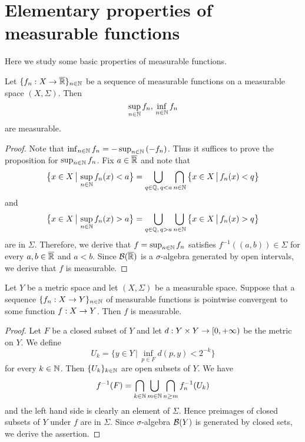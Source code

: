 \section{Elementary properties of measurable functions}
\noindent
Here we study some basic properties of measurable functions.

\begin{proposition}\label{proposition:measurable_functions_closed_under_supremum}
Let $\{f_n:X\rightarrow \overline{{\mathbb R}}\}_{n\in {\mathbb N}}$ be a sequence of measurable functions on a measurable space $(X,\Sigma)$. Then
$$\sup_{n\in {\mathbb N}}f_n,\,\inf_{n\in {\mathbb N}}f_n$$
are measurable.
\end{proposition}
\begin{proof}
Note that $\inf_{n\in {\mathbb N}}f_n = -\sup_{n\in {\mathbb N}}\left(-f_n\right)$. Thus it suffices to prove the proposition for $\sup_{n\in {\mathbb N}}f_n$. Fix $a\in \overline{{\mathbb R}}$ and note that
$$\big\{x\in X\,\big|\,\sup_{n\in {\mathbb N}}f_n(x)< a\big\} = \bigcup_{q\in {\mathbb Q},\,q<a}\bigcap_{n\in {\mathbb N}}\big\{x\in X\,\big|\,f_n(x)<q\big\}$$
and
$$\big\{x\in X\,\big|\,\sup_{n\in {\mathbb N}}f_n(x)>a\big\} = \bigcup_{q\in {\mathbb Q},\,q>a}\bigcup_{n\in {\mathbb N}}\big\{x\in X\,\big|\,f_n(x)>q\big\}$$
are in $\Sigma$. Therefore, we derive that $f = \sup_{n\in {\mathbb N}}f_n$ satisfies $f^{-1}\left((a,b)\right)\in \Sigma$ for every $a, b\in \overline{{\mathbb R}}$ and $a<b$. Since ${\mathcal B}(\overline{{\mathbb R}})$ is a $\sigma$-algebra generated by open intervals, we derive that $f$ is measurable.
\end{proof}

\begin{proposition}\label{proposition:measurable_functions_closed_under_pointwise_limits}
Let $Y$ be a metric space and let $(X,\Sigma)$ be a measurable space. Suppose that a sequence $\{f_n:X\rightarrow Y\}_{n\in {\mathbb N}}$ of measurable functions is pointwise convergent to some function $f:X\rightarrow Y$. Then $f$ is measurable.
\end{proposition}
\begin{proof}
Let $F$ be a closed subset of $Y$ and let $d:Y\times Y\rightarrow [0,+\infty)$ be the metric on $Y$. We define
$$U_k = \big\{y \in Y\,\big|\,\inf_{p\in F} d(p,y) < 2^{-k}\big\}$$
for every $k\in {\mathbb N}$. Then $\{U_k\}_{k\in {\mathbb N}}$ are open subsets of $Y$. We have
$$f^{-1}(F) =\bigcap_{k\in {\mathbb N}}\bigcup_{m\in {\mathbb N}}\bigcap_{n\geq m}f_n^{-1}(U_k)$$
and the left hand side is clearly an element of $\Sigma$. Hence preimages of closed subsets of $Y$ under $f$ are in $\Sigma$. Since $\sigma$-algebra ${\mathcal B}(Y)$ is generated by closed sets, we derive the assertion.
\end{proof}

